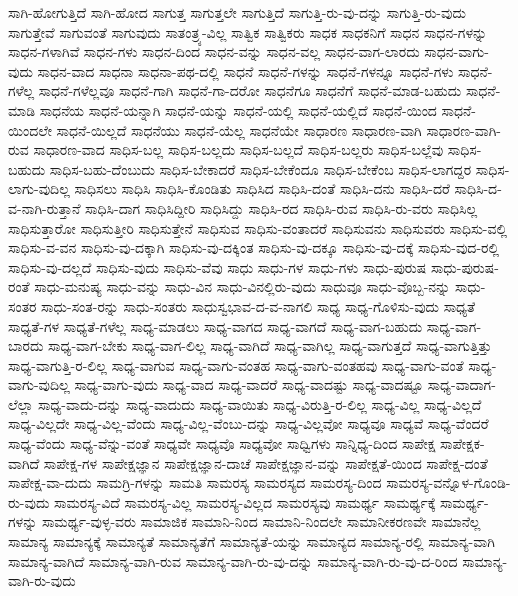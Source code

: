 {ಸಾಗಿ-ಹೋಗುತ್ತಿದೆ
ಸಾಗಿ-ಹೋದ
ಸಾಗುತ್ತ
ಸಾಗುತ್ತಲೇ
ಸಾಗುತ್ತಿದೆ
ಸಾಗುತ್ತಿ-ರು-ವು-ದನ್ನು
ಸಾಗುತ್ತಿ-ರು-ವುದು
ಸಾಗುತ್ತೇವೆ
ಸಾಗುವಂತೆ
ಸಾಗುವುದು
ಸಾತಂತ್ರ್ಯ-ವಿಲ್ಲ
ಸಾತ್ವಿಕ
ಸಾತ್ವಿಕರು
ಸಾಧಕ
ಸಾಧಕನಿಗೆ
ಸಾಧನ
ಸಾಧನ-ಗಳನ್ನು
ಸಾಧನ-ಗಳಾಗಿವೆ
ಸಾಧನ-ಗಳು
ಸಾಧನ-ದಿಂದ
ಸಾಧನ-ವನ್ನು
ಸಾಧನ-ವಲ್ಲ
ಸಾಧನ-ವಾಗ-ಲಾರದು
ಸಾಧನ-ವಾಗು-ವುದು
ಸಾಧನ-ವಾದ
ಸಾಧನಾ
ಸಾಧನಾ-ಪಥ-ದಲ್ಲಿ
ಸಾಧನೆ
ಸಾಧನೆ-ಗಳನ್ನು
ಸಾಧನೆ-ಗಳನ್ನೂ
ಸಾಧನೆ-ಗಳು
ಸಾಧನೆ-ಗಳೆಲ್ಲ
ಸಾಧನೆ-ಗಳೆಲ್ಲವೂ
ಸಾಧನೆ-ಗಾಗಿ
ಸಾಧನೆ-ಗಾ-ದರೋ
ಸಾಧನೆಗೂ
ಸಾಧನೆಗೆ
ಸಾಧನೆ-ಮಾಡ-ಬಹುದು
ಸಾಧನೆ-ಮಾಡಿ
ಸಾಧನೆಯ
ಸಾಧನೆ-ಯನ್ನಾಗಿ
ಸಾಧನೆ-ಯನ್ನು
ಸಾಧನೆ-ಯಲ್ಲಿ
ಸಾಧನೆ-ಯಲ್ಲಿದೆ
ಸಾಧನೆ-ಯಿಂದ
ಸಾಧನೆ-ಯಿಂದಲೇ
ಸಾಧನೆ-ಯಿಲ್ಲದೆ
ಸಾಧನೆಯು
ಸಾಧನೆ-ಯೆಲ್ಲ
ಸಾಧನೆಯೇ
ಸಾಧಾರಣ
ಸಾಧಾರಣ-ವಾಗಿ
ಸಾಧಾರಣ-ವಾಗಿ-ರುವ
ಸಾಧಾರಣ-ವಾದ
ಸಾಧಿಸ-ಬಲ್ಲ
ಸಾಧಿಸ-ಬಲ್ಲದು
ಸಾಧಿಸ-ಬಲ್ಲದೆ
ಸಾಧಿಸ-ಬಲ್ಲರು
ಸಾಧಿಸ-ಬಲ್ಲೆವು
ಸಾಧಿಸ-ಬಹುದು
ಸಾಧಿಸ-ಬಹು-ದೆಂಬುದು
ಸಾಧಿಸ-ಬೇಕಾದರೆ
ಸಾಧಿಸ-ಬೇಕೆಂದೂ
ಸಾಧಿಸ-ಬೇಕೆಂಬ
ಸಾಧಿಸ-ಲಾಗದ್ದರ
ಸಾಧಿಸ-ಲಾಗು-ವುದಿಲ್ಲ
ಸಾಧಿಸಲು
ಸಾಧಿಸಿ
ಸಾಧಿಸಿ-ಕೊಂಡಿತು
ಸಾಧಿಸಿದ
ಸಾಧಿಸಿ-ದಂತೆ
ಸಾಧಿಸಿ-ದನು
ಸಾಧಿಸಿ-ದರೆ
ಸಾಧಿಸಿ-ದ-ವ-ನಾಗಿ-ರುತ್ತಾನೆ
ಸಾಧಿಸಿ-ದಾಗ
ಸಾಧಿಸಿದ್ದೀರಿ
ಸಾಧಿಸಿದ್ದು
ಸಾಧಿಸಿ-ರದ
ಸಾಧಿಸಿ-ರುವ
ಸಾಧಿಸಿ-ರು-ವರು
ಸಾಧಿಸಿಲ್ಲ
ಸಾಧಿಸುತ್ತಾರೋ
ಸಾಧಿಸುತ್ತೀರಿ
ಸಾಧಿಸುತ್ತೇನೆ
ಸಾಧಿಸುವ
ಸಾಧಿಸು-ವಂತಾದರೆ
ಸಾಧಿಸುವನು
ಸಾಧಿಸುವರು
ಸಾಧಿಸು-ವಲ್ಲಿ
ಸಾಧಿಸು-ವ-ವನ
ಸಾಧಿಸು-ವು-ದಕ್ಕಾಗಿ
ಸಾಧಿಸು-ವು-ದಕ್ಕಿಂತ
ಸಾಧಿಸು-ವು-ದಕ್ಕೂ
ಸಾಧಿಸು-ವು-ದಕ್ಕೆ
ಸಾಧಿಸು-ವುದ-ರಲ್ಲಿ
ಸಾಧಿಸು-ವು-ದಲ್ಲದೆ
ಸಾಧಿಸು-ವುದು
ಸಾಧಿಸು-ವೆವು
ಸಾಧು
ಸಾಧು-ಗಳ
ಸಾಧು-ಗಳು
ಸಾಧು-ಪುರುಷ
ಸಾಧು-ಪುರುಷ-ರಂತೆ
ಸಾಧು-ಮನುಷ್ಯ
ಸಾಧು-ವನ್ನು
ಸಾಧು-ವಿನ
ಸಾಧು-ವಿನಲ್ಲಿರು-ವುದು
ಸಾಧುವೂ
ಸಾಧು-ವೊಬ್ಬ-ನನ್ನು
ಸಾಧು-ಸಂತರ
ಸಾಧು-ಸಂತ-ರನ್ನು
ಸಾಧು-ಸಂತರು
ಸಾಧುಸ್ವಭಾವ-ದ-ವ-ನಾಗಲಿ
ಸಾಧ್ಯ
ಸಾಧ್ಯ-ಗೊಳಿಸು-ವುದು
ಸಾಧ್ಯತೆ
ಸಾಧ್ಯತೆ-ಗಳ
ಸಾಧ್ಯತೆ-ಗಳೆಲ್ಲ
ಸಾಧ್ಯ-ಮಾಡಲು
ಸಾಧ್ಯ-ವಾಗದ
ಸಾಧ್ಯ-ವಾಗದೆ
ಸಾಧ್ಯ-ವಾಗ-ಬಹುದು
ಸಾಧ್ಯ-ವಾಗ-ಬಾರದು
ಸಾಧ್ಯ-ವಾಗ-ಬೇಕು
ಸಾಧ್ಯ-ವಾಗ-ಲಿಲ್ಲ
ಸಾಧ್ಯ-ವಾಗಿದೆ
ಸಾಧ್ಯ-ವಾಗಿಲ್ಲ
ಸಾಧ್ಯ-ವಾಗುತ್ತದೆ
ಸಾಧ್ಯ-ವಾಗುತ್ತಿತ್ತು
ಸಾಧ್ಯ-ವಾಗುತ್ತಿ-ರ-ಲಿಲ್ಲ
ಸಾಧ್ಯ-ವಾಗುವ
ಸಾಧ್ಯ-ವಾಗು-ವಂತಹ
ಸಾಧ್ಯ-ವಾಗು-ವಂತಹವು
ಸಾಧ್ಯ-ವಾಗು-ವಂತೆ
ಸಾಧ್ಯ-ವಾಗು-ವುದಿಲ್ಲ
ಸಾಧ್ಯ-ವಾಗು-ವುದು
ಸಾಧ್ಯ-ವಾದ
ಸಾಧ್ಯ-ವಾದರೆ
ಸಾಧ್ಯ-ವಾದಷ್ಟು
ಸಾಧ್ಯ-ವಾದಷ್ಟೂ
ಸಾಧ್ಯ-ವಾದಾಗ-ಲೆಲ್ಲಾ
ಸಾಧ್ಯ-ವಾದು-ದನ್ನು
ಸಾಧ್ಯ-ವಾದುದು
ಸಾಧ್ಯ-ವಾಯಿತು
ಸಾಧ್ಯ-ವಿರುತ್ತಿ-ರ-ಲಿಲ್ಲ
ಸಾಧ್ಯ-ವಿಲ್ಲ
ಸಾಧ್ಯ-ವಿಲ್ಲದೆ
ಸಾಧ್ಯ-ವಿಲ್ಲದೇ
ಸಾಧ್ಯ-ವಿಲ್ಲ-ವೆಂದು
ಸಾಧ್ಯ-ವಿಲ್ಲ-ವೆಂಬು-ದನ್ನು
ಸಾಧ್ಯ-ವಿಲ್ಲವೋ
ಸಾಧ್ಯವೂ
ಸಾಧ್ಯವೆ
ಸಾಧ್ಯ-ವೆಂದರೆ
ಸಾಧ್ಯ-ವೆಂದು
ಸಾಧ್ಯ-ವೆನ್ನು-ವಂತೆ
ಸಾಧ್ಯವೇ
ಸಾಧ್ಯವೊ
ಸಾಧ್ಯವೋ
ಸಾಧ್ವಿಗಳು
ಸಾನ್ನಿಧ್ಯ-ದಿಂದ
ಸಾಪೇಕ್ಷ
ಸಾಪೇಕ್ಷಕ-ವಾಗಿದೆ
ಸಾಪೇಕ್ಷ-ಗಳ
ಸಾಪೇಕ್ಷಜ್ಞಾನ
ಸಾಪೇಕ್ಷಜ್ಞಾನ-ದಾಚೆ
ಸಾಪೇಕ್ಷಜ್ಞಾನ-ವನ್ನು
ಸಾಪೇಕ್ಷತೆ-ಯಿಂದ
ಸಾಪೇಕ್ಷ-ದಂತೆ
ಸಾಪೇಕ್ಷ-ವಾ-ದುದು
ಸಾಮಗ್ರಿ-ಗಳನ್ನು
ಸಾಮತಿ
ಸಾಮರಸ್ಯ
ಸಾಮರಸ್ಯದ
ಸಾಮರಸ್ಯ-ದಿಂದ
ಸಾಮರಸ್ಯ-ವನ್ನೊಳ-ಗೊಂಡಿ-ರು-ವುದು
ಸಾಮರಸ್ಯ-ವಿದೆ
ಸಾಮರಸ್ಯ-ವಿಲ್ಲ
ಸಾಮರಸ್ಯ-ವಿಲ್ಲದ
ಸಾಮರಸ್ಯವು
ಸಾಮರ್ಥ್ಯ
ಸಾಮರ್ಥ್ಯಕ್ಕೆ
ಸಾಮರ್ಥ್ಯ-ಗಳನ್ನು
ಸಾಮರ್ಥ್ಯ-ವುಳ್ಳ-ವರು
ಸಾಮಾಜಿಕ
ಸಾಮಾನಿ-ನಿಂದ
ಸಾಮಾನಿ-ನಿಂದಲೇ
ಸಾಮಾನೀಕರಣವೇ
ಸಾಮಾನೆಲ್ಲ
ಸಾಮಾನ್ಯ
ಸಾಮಾನ್ಯಕ್ಕೆ
ಸಾಮಾನ್ಯತೆ
ಸಾಮಾನ್ಯತೆಗೆ
ಸಾಮಾನ್ಯತೆ-ಯನ್ನು
ಸಾಮಾನ್ಯದ
ಸಾಮಾನ್ಯ-ರಲ್ಲಿ
ಸಾಮಾನ್ಯ-ವಾಗಿ
ಸಾಮಾನ್ಯ-ವಾಗಿದೆ
ಸಾಮಾನ್ಯ-ವಾಗಿ-ರುವ
ಸಾಮಾನ್ಯ-ವಾಗಿ-ರು-ವು-ದನ್ನು
ಸಾಮಾನ್ಯ-ವಾಗಿ-ರು-ವು-ದ-ರಿಂದ
ಸಾಮಾನ್ಯ-ವಾಗಿ-ರು-ವುದು
}
